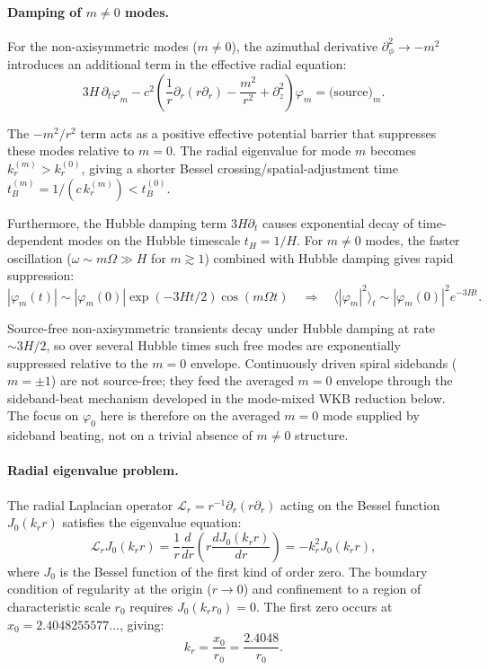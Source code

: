 \documentclass[11pt]{article}
\begin{document}
\paragraph{Damping of $m \neq 0$ modes.}
For the non-axisymmetric modes ($m \neq 0$), the azimuthal derivative $\partial_\phi^2 \to -m^2$ introduces an additional term in the effective radial equation:
\begin{equation}
3H\,\partial_t \varphi_m - c^2\left(\frac{1}{r}\partial_r(r\partial_r) - \frac{m^2}{r^2} + \partial_z^2\right)\varphi_m = \text{(source)}_m.
\label{eq:mmode_equation}
\end{equation}

The $-m^2/r^2$ term acts as a positive effective potential barrier that suppresses these modes relative to $m=0$. The radial eigenvalue for mode $m$ becomes $k_r^{(m)} > k_r^{(0)}$, giving a shorter Bessel crossing/spatial-adjustment time $t_B^{(m)} = 1/(c\,k_r^{(m)}) < t_B^{(0)}$.

Furthermore, the Hubble damping term $3H \partial_t$ causes exponential decay of time-dependent modes on the Hubble timescale $t_H = 1/H$. For $m \neq 0$ modes, the faster oscillation ($\omega \sim m\Omega \gg H$ for $m \gtrsim 1$) combined with Hubble damping gives rapid suppression:
\begin{equation}
|\varphi_m(t)| \sim |\varphi_m(0)| \exp(-3Ht/2) \cos(m\Omega t) \quad \Rightarrow \quad \langle |\varphi_m|^2 \rangle_t \sim |\varphi_m(0)|^2 e^{-3Ht}.
\label{eq:mmode_damping}
\end{equation}

Source-free non-axisymmetric transients decay under Hubble damping at rate $\sim3H/2$, so over several Hubble times such free modes are exponentially suppressed relative to the $m=0$ envelope. Continuously driven spiral sidebands ($m=\pm1$) are not source-free; they feed the averaged $m=0$ envelope through the sideband-beat mechanism developed in the mode-mixed WKB reduction below. The focus on $\varphi_0$ here is therefore on the averaged $m=0$ mode supplied by sideband beating, not on a trivial absence of $m\neq0$ structure.

\paragraph{Radial eigenvalue problem.}
The radial Laplacian operator $\mathcal{L}_r = r^{-1}\partial_r(r\partial_r)$ acting on the Bessel function $J_0(k_r r)$ satisfies the eigenvalue equation:
\begin{equation}
\mathcal{L}_r J_0(k_r r) = \frac{1}{r}\frac{d}{dr}\left(r\frac{dJ_0(k_r r)}{dr}\right) = -k_r^2 J_0(k_r r),
\label{eq:bessel_eigenvalue}
\end{equation}
where $J_0$ is the Bessel function of the first kind of order zero. The boundary condition of regularity at the origin ($r \to 0$) and confinement to a region of characteristic scale $r_0$ requires $J_0(k_r r_0) = 0$. The first zero occurs at $x_0 = 2.4048255577...$, giving:
\begin{equation}
k_r = \frac{x_0}{r_0} = \frac{2.4048}{r_0}.
\label{eq:k_r_exact}
\end{equation}
\end{document}
